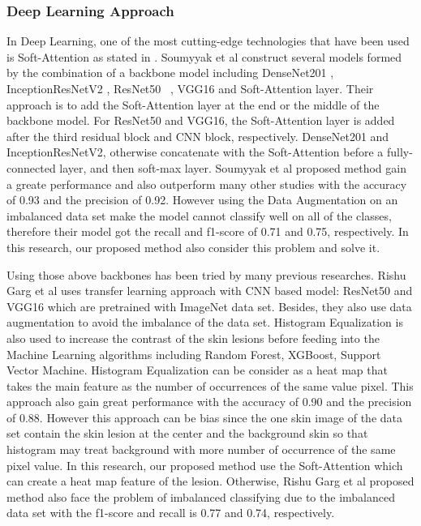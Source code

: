 \documentclass[sensors,article,submit,pdftex,moreauthors]{Definitions/mdpi}
\begin{document}
{\subsubsection{Deep Learning Approach}
In Deep Learning, one of the most cutting-edge technologies that have been used is Soft-Attention as stated in \mbox{\cite{03358}}. Soumyyak et al construct several models formed by the combination of a backbone model including DenseNet201 \mbox{\cite{06993}}, InceptionResNetV2 \mbox{\cite{00567}}, ResNet50 \mbox{\cite{03385} \cite{05027}}, VGG16 \mbox{\cite{1556}} and Soft-Attention layer. Their approach is to add the Soft-Attention layer at the end or the middle of the backbone model. For ResNet50 and VGG16, the Soft-Attention layer is added after the third residual block and CNN block, respectively. DenseNet201 and InceptionResNetV2, otherwise concatenate with the Soft-Attention before a fully-connected layer, and then soft-max layer. Soumyyak et al proposed method gain a greate performance and also outperform many other studies with the accuracy of 0.93 and the precision of 0.92. However using the Data Augmentation on an imbalanced data set make the model cannot classify well on all of the classes, therefore their model got the recall and f1-score of 0.71 and 0.75, respectively. In this research, our proposed method also consider this problem and solve it.

Using those above backbones has been tried by many previous researches. Rishu Garg et al \mbox{\cite{03798}} uses transfer learning approach with CNN based model: ResNet50 and VGG16 which are pretrained with ImageNet data set. Besides, they also use data augmentation to avoid the imbalance of the data set. Histogram Equalization is also used to increase the contrast of the skin lesions before feeding into the Machine Learning algorithms including Random Forest, XGBoost, Support Vector Machine.	Histogram Equalization can be consider as a heat map that takes the main feature as the number of occurrences of the same value pixel. This approach also gain great performance with the accuracy of 0.90 and the precision of 0.88. However this approach can be bias since the one skin image of the data set contain the skin lesion at the center and the background skin so that histogram may treat background with more number of occurrence of the same pixel value. In this research, our proposed method use the Soft-Attention which can create a heat map feature of the lesion. Otherwise, Rishu Garg et al proposed method also face the problem of imbalanced classifying due to the imbalanced data set with the f1-score and recall is 0.77 and 0.74, respectively.

}
\end{document}
